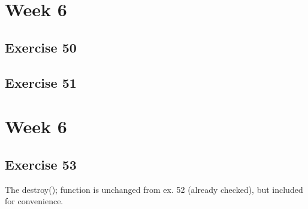 \documentclass[a4paper]{article}
\let\stdsection\section
\renewcommand\section{\newpage\stdsection}
\begin{document}
\section*{Week 6}
\subsection*{Exercise 50}

















\newpage
\subsection*{Exercise 51}


\newpage
\section*{Week 6}
\subsection*{Exercise 53}






The destroy(); function is unchanged from ex. 52 (already checked), but included for convenience.




\end{document}
